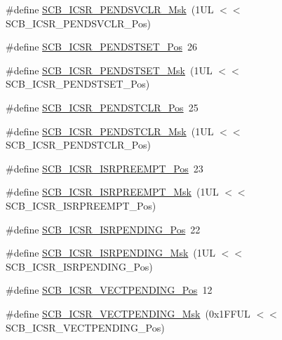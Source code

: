 \begin{DoxyCompactItemize}
\item 
\#define \hyperlink{group___c_m_s_i_s___s_c_b_ga4a901ace381d3c1c74ac82b22fae2e1e}{S\+C\+B\+\_\+\+I\+C\+S\+R\+\_\+\+P\+E\+N\+D\+S\+V\+C\+L\+R\+\_\+\+Msk}~(1\+U\+L $<$$<$ S\+C\+B\+\_\+\+I\+C\+S\+R\+\_\+\+P\+E\+N\+D\+S\+V\+C\+L\+R\+\_\+\+Pos)
\item 
\#define \hyperlink{group___c_m_s_i_s___s_c_b_ga9dbb3358c6167c9c3f85661b90fb2794}{S\+C\+B\+\_\+\+I\+C\+S\+R\+\_\+\+P\+E\+N\+D\+S\+T\+S\+E\+T\+\_\+\+Pos}~26
\item 
\#define \hyperlink{group___c_m_s_i_s___s_c_b_ga7325b61ea0ec323ef2d5c893b112e546}{S\+C\+B\+\_\+\+I\+C\+S\+R\+\_\+\+P\+E\+N\+D\+S\+T\+S\+E\+T\+\_\+\+Msk}~(1\+U\+L $<$$<$ S\+C\+B\+\_\+\+I\+C\+S\+R\+\_\+\+P\+E\+N\+D\+S\+T\+S\+E\+T\+\_\+\+Pos)
\item 
\#define \hyperlink{group___c_m_s_i_s___s_c_b_gadbe25e4b333ece1341beb1a740168fdc}{S\+C\+B\+\_\+\+I\+C\+S\+R\+\_\+\+P\+E\+N\+D\+S\+T\+C\+L\+R\+\_\+\+Pos}~25
\item 
\#define \hyperlink{group___c_m_s_i_s___s_c_b_gab241827d2a793269d8cd99b9b28c2157}{S\+C\+B\+\_\+\+I\+C\+S\+R\+\_\+\+P\+E\+N\+D\+S\+T\+C\+L\+R\+\_\+\+Msk}~(1\+U\+L $<$$<$ S\+C\+B\+\_\+\+I\+C\+S\+R\+\_\+\+P\+E\+N\+D\+S\+T\+C\+L\+R\+\_\+\+Pos)
\item 
\#define \hyperlink{group___c_m_s_i_s___s_c_b_ga11cb5b1f9ce167b81f31787a77e575df}{S\+C\+B\+\_\+\+I\+C\+S\+R\+\_\+\+I\+S\+R\+P\+R\+E\+E\+M\+P\+T\+\_\+\+Pos}~23
\item 
\#define \hyperlink{group___c_m_s_i_s___s_c_b_gaa966600396290808d596fe96e92ca2b5}{S\+C\+B\+\_\+\+I\+C\+S\+R\+\_\+\+I\+S\+R\+P\+R\+E\+E\+M\+P\+T\+\_\+\+Msk}~(1\+U\+L $<$$<$ S\+C\+B\+\_\+\+I\+C\+S\+R\+\_\+\+I\+S\+R\+P\+R\+E\+E\+M\+P\+T\+\_\+\+Pos)
\item 
\#define \hyperlink{group___c_m_s_i_s___s_c_b_ga10749d92b9b744094b845c2eb46d4319}{S\+C\+B\+\_\+\+I\+C\+S\+R\+\_\+\+I\+S\+R\+P\+E\+N\+D\+I\+N\+G\+\_\+\+Pos}~22
\item 
\#define \hyperlink{group___c_m_s_i_s___s_c_b_ga056d74fd538e5d36d3be1f28d399c877}{S\+C\+B\+\_\+\+I\+C\+S\+R\+\_\+\+I\+S\+R\+P\+E\+N\+D\+I\+N\+G\+\_\+\+Msk}~(1\+U\+L $<$$<$ S\+C\+B\+\_\+\+I\+C\+S\+R\+\_\+\+I\+S\+R\+P\+E\+N\+D\+I\+N\+G\+\_\+\+Pos)
\item 
\#define \hyperlink{group___c_m_s_i_s___s_c_b_gada60c92bf88d6fd21a8f49efa4a127b8}{S\+C\+B\+\_\+\+I\+C\+S\+R\+\_\+\+V\+E\+C\+T\+P\+E\+N\+D\+I\+N\+G\+\_\+\+Pos}~12
\item 
\#define \hyperlink{group___c_m_s_i_s___s_c_b_gacb6992e7c7ddc27a370f62878a21ef72}{S\+C\+B\+\_\+\+I\+C\+S\+R\+\_\+\+V\+E\+C\+T\+P\+E\+N\+D\+I\+N\+G\+\_\+\+Msk}~(0x1\+F\+F\+U\+L $<$$<$ S\+C\+B\+\_\+\+I\+C\+S\+R\+\_\+\+V\+E\+C\+T\+P\+E\+N\+D\+I\+N\+G\+\_\+\+Pos)

\end{DoxyCompactItemize}
